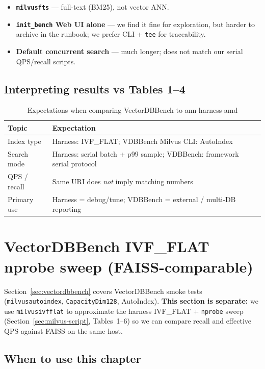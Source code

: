 \documentclass[11pt,a4paper]{article}
\begin{document}
\begin{itemize}[leftmargin=*]
  \item \textbf{\texttt{milvusfts}} --- full-text (BM25), not vector ANN.
  \item \textbf{\texttt{init\_bench} Web UI alone} --- we find it fine for exploration, but harder to
        archive in the runbook; we prefer CLI + \texttt{tee} for traceability.
  \item \textbf{Default concurrent search} --- much longer; does not match our serial
        QPS/recall scripts.
\end{itemize}

\subsection{Interpreting results vs Tables 1--4}

\begin{table}[h]
\centering
\caption{Expectations when comparing VectorDBBench to ann-harness-amd}
\begin{tabular}{@{}ll@{}}
\toprule
\textbf{Topic} & \textbf{Expectation} \\
\midrule
Index type & Harness: IVF\_FLAT; VDBBench Milvus CLI: AutoIndex \\
Search mode & Harness: serial batch + p99 sample; VDBBench: framework serial protocol \\
QPS / recall & Same URI does \emph{not} imply matching numbers \\
Primary use & Harness = debug/tune; VDBBench = external / multi-DB reporting \\
\bottomrule
\end{tabular}
\end{table}

\section{VectorDBBench IVF\_FLAT nprobe sweep (FAISS-comparable)}
\label{sec:vectordbbench-ivf-nprobe}

Section~\ref{sec:vectordbbench} covers VectorDBBench smoke tests (\texttt{milvusautoindex},
\texttt{CapacityDim128}, AutoIndex). \textbf{This section is separate:} we use
\texttt{milvusivfflat} to approximate the harness IVF\_FLAT{} + \texttt{nprobe} sweep
(Section~\ref{sec:milvus-script}, Tables~1--6) so we can compare recall and effective QPS
against FAISS on the same host.

\subsection{When to use this chapter}
\end{document}
